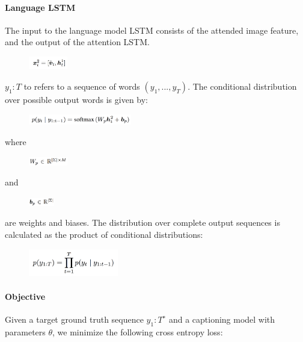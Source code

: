 \documentclass[a4paper]{article}
\begin{document}
\paragraph{Language LSTM}
The input to the language model LSTM consists of the attended image feature, and the output of the attention LSTM.
\begin{figure}[H]
\centering
\includegraphics[width=0.15\textwidth]{g.png}
\end{figure}
$y_1:T$ to refers to a sequence of words
$(y_1, ..., y_T )$. The conditional distribution
over possible output words is given by:
\begin{figure}[H]
\centering
\includegraphics[width=0.4\textwidth]{h.png}
\end{figure}

where
\begin{figure}[H]
\centering
\includegraphics[width=0.15\textwidth]{i.png}
\end{figure}
and 
\begin{figure}[H]
\centering
\includegraphics[width=0.10\textwidth]{j.png}
\end{figure}

\noindent are weights and biases. The distribution over complete output sequences is calculated as the product of conditional distributions:

\begin{figure}[H]
\centering
\includegraphics[width=0.35\textwidth]{k.png}
\end{figure}

\paragraph{Objective}
Given a target ground truth sequence $y
_1:T^∗$ and a captioning model with parameters $\theta$, we minimize the following cross entropy loss:
\end{document}

